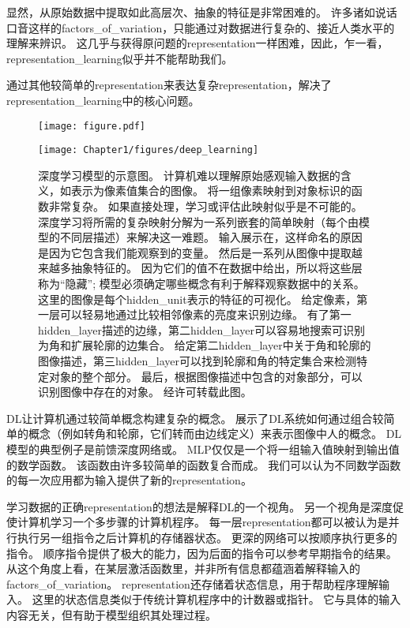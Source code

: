 显然，从原始数据中提取如此高层次、抽象的特征是非常困难的。
许多诸如说话口音这样的\gls{factors_of_variation}，只能通过对数据进行复杂的、接近人类水平的理解来辨识。
这几乎与获得原问题的\gls{representation}一样困难，因此，乍一看，\gls{representation_learning}似乎并不能帮助我们。

通过其他较简单的\gls{representation}来表达复杂\gls{representation}，解决了\gls{representation_learning}中的核心问题。

\begin{figure}[!htb]
\ifOpenSource
\centerline{\texttt{[image: figure.pdf]}}
\else
\centerline{\texttt{[image: Chapter1/figures/deep\_learning]}}
\fi
\caption{深度学习模型的示意图。 计算机难以理解原始感观输入数据的含义，如表示为像素值集合的图像。
将一组像素映射到对象标识的函数非常复杂。
如果直接处理，学习或评估此映射似乎是不可能的。
深度学习将所需的复杂映射分解为一系列嵌套的简单映射（每个由模型的不同层描述）来解决这一难题。
输入展示在，这样命名的原因是因为它包含我们能观察到的变量。
然后是一系列从图像中提取越来越多抽象特征的。
因为它们的值不在数据中给出，所以将这些层称为``隐藏''; 模型必须确定哪些概念有利于解释观察数据中的关系。
这里的图像是每个\gls{hidden_unit}表示的特征的可视化。
给定像素，第一层可以轻易地通过比较相邻像素的亮度来识别边缘。
有了第一\gls{hidden_layer}描述的边缘，第二\gls{hidden_layer}可以容易地搜索可识别为角和扩展轮廓的边集合。
给定第二\gls{hidden_layer}中关于角和轮廓的图像描述，第三\gls{hidden_layer}可以找到轮廓和角的特定集合来检测特定对象的整个部分。
最后，根据图像描述中包含的对象部分，可以识别图像中存在的对象。
经\citet{ZeilerFergus14}许可转载此图。
}
\label{fig:chap1_deep_learning}
\end{figure}

\gls{DL}让计算机通过较简单概念构建复杂的概念。
展示了\gls{DL}系统如何通过组合较简单的概念（例如转角和轮廓，它们转而由边线定义）来表示图像中人的概念。
\gls{DL}模型的典型例子是前馈深度网络或。
\gls{MLP}仅仅是一个将一组输入值映射到输出值的数学函数。
该函数由许多较简单的函数复合而成。
我们可以认为不同数学函数的每一次应用都为输入提供了新的\gls{representation}。

学习数据的正确\gls{representation}的想法是解释\gls{DL}的一个视角。
另一个视角是深度促使计算机学习一个多步骤的计算机程序。
每一层\gls{representation}都可以被认为是并行执行另一组指令之后计算机的存储器状态。
更深的网络可以按顺序执行更多的指令。
顺序指令提供了极大的能力，因为后面的指令可以参考早期指令的结果。
从这个角度上看，在某层激活函数里，并非所有信息都蕴涵着解释输入的\gls{factors_of_variation}。
\gls{representation}还存储着状态信息，用于帮助程序理解输入。
这里的状态信息类似于传统计算机程序中的计数器或指针。
它与具体的输入内容无关，但有助于模型组织其处理过程。

